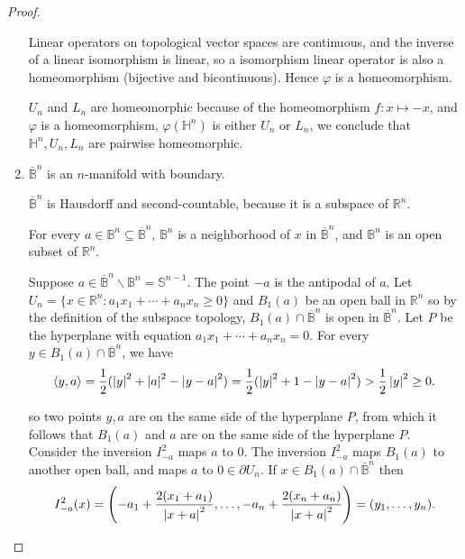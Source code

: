 \begin{proof}
\begin{enumerate}[label={\textbf{Step \arabic*.}},itemindent=1cm]
		      Linear operators on topological vector spaces are continuous, and the inverse of a linear isomorphism is linear, so a isomorphism linear operator is also a homeomorphism (bijective and bicontinuous). Hence $\varphi$ is a homeomorphism.

		      $U_{n}$ and $L_{n}$ are homeomorphic because of the homeomorphism $f: x\mapsto -x$, and $\varphi$ is a homeomorphism, $\varphi(\mathbb{H}^{n})$ is either $U_{n}$ or $L_{n}$, we conclude that $\mathbb{H}^{n}, U_{n}, L_{n}$ are pairwise homeomorphic.
		\item $\overline{\mathbb{B}}^{n}$ is an $n$-manifold with boundary.

		      $\overline{\mathbb{B}}^{n}$ is Hausdorff and second-countable, because it is a subspace of $\mathbb{R}^{n}$.

		      For every $a\in \mathbb{B}^{n}\subseteq\overline{\mathbb{B}}^{n}$, $\mathbb{B}^{n}$ is a neighborhood of $x$ in $\overline{\mathbb{B}}^{n}$, and $\mathbb{B}^{n}$ is an open subset of $\mathbb{R}^{n}$.

		      Suppose $a\in \overline{\mathbb{B}}^{n}\smallsetminus\mathbb{B}^{n} = \mathbb{S}^{n-1}$. The point $-a$ is the antipodal of $a$. Let $U_{n} = \{ x\in\mathbb{R}^{n}: a_{1}x_{1} + \cdots + a_{n}x_{n} \geq 0 \}$ and $B_{1}(a)$ be an open ball in $\mathbb{R}^{n}$ so by the definition of the subspace topology, $B_{1}(a)\cap \overline{\mathbb{B}}^{n}$ is open in $\overline{\mathbb{B}}^{n}$. Let $P$ be the hyperplane with equation $a_{1}x_{1} + \cdots + a_{n}x_{n} = 0$. For every $y\in B_{1}(a)\cap \overline{\mathbb{B}}^{n}$, we have
		      \[
			      \left\langle{y, a}\right\rangle = \frac{1}{2}(\left\vert{y}\right\vert^{2} + \left\vert{a}\right\vert^{2} - \left\vert{y - a}\right\vert^{2}) = \frac{1}{2}(\left\vert{y}\right\vert^{2} + 1 - \left\vert{y - a}\right\vert^{2}) > \frac{1}{2}\left\vert{y}\right\vert^{2}\geq 0.
		      \]

		      so two points $y, a$ are on the same side of the hyperplane $P$, from which it follows that $B_{1}(a)$ and $a$ are on the same side of the hyperplane $P$. Consider the inversion $I^{2}_{-a}$ maps $a$ to $0$. The inversion $I^{2}_{-a}$ maps $B_{1}(a)$ to another open ball, and maps $a$ to $0\in \partial U_{n}$. If $x\in B_{1}(a) \cap\overline{\mathbb{B}}^{n}$ then
		      \[
			      I^{2}_{-a}(x) = \left( -a_{1} + \frac{2(x_{1} + a_{1})}{\left\vert{x + a}\right\vert^{2}}, \ldots, -a_{n} + \frac{2(x_{n} + a_{n})}{\left\vert{x + a}\right\vert^{2}} \right) = (y_{1}, \ldots, y_{n}).
		      \]


\end{enumerate}
\end{proof}
